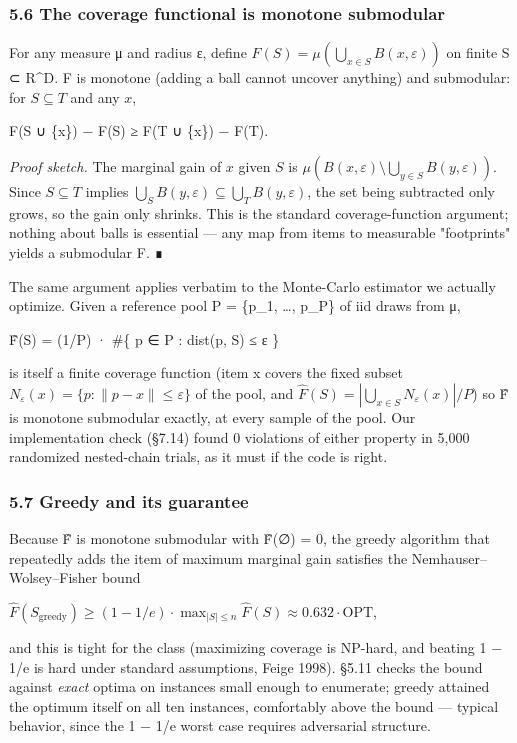 \documentclass[
  10pt,
]{article}
\theoremstyle{plain}
\theoremstyle{definition}
\begin{document}
\subsubsection{5.6 The coverage functional is monotone
submodular}\label{56-the-coverage-functional-is-monotone-submodular}

For any measure μ and radius ε, define
\(F(S) = \mu(\bigcup_{x \in S} B(x,\varepsilon))\) on finite S ⊂ R\^{}D.
F is monotone (adding a ball cannot uncover anything) and submodular:
for \(S \subseteq T\) and any \(x\),

F(S ∪ \{x\}) − F(S) ≥ F(T ∪ \{x\}) − F(T).

\emph{Proof sketch.} The marginal gain of \(x\) given \(S\) is
\(\mu(B(x,\varepsilon) \setminus \bigcup_{y \in S} B(y,\varepsilon))\).
Since \(S \subseteq T\) implies
\(\bigcup_S B(y,\varepsilon) \subseteq \bigcup_T B(y,\varepsilon)\), the
set being subtracted only grows, so the gain only shrinks. This is the
standard coverage-function argument; nothing about balls is essential
--- any map from items to measurable "footprints" yields a submodular F.
∎

The same argument applies verbatim to the Monte-Carlo estimator we
actually optimize. Given a reference pool P = \{p\_1, \ldots, p\_P\} of
iid draws from μ,

F̂(S) = (1/P) · \#\{ p ∈ P : dist(p, S) ≤ ε \}

is itself a finite coverage function (item x covers the fixed subset
\(N_\varepsilon(x) = \{p : \lVert p - x\rVert \le \varepsilon\}\) of the
pool, and \(\hat F(S) = |\bigcup_{x \in S} N_\varepsilon(x)|/P\)) so F̂
is monotone submodular exactly, at every sample of the pool. Our
implementation check (§7.14) found 0 violations of either property in
5,000 randomized nested-chain trials, as it must if the code is right.

\subsubsection{5.7 Greedy and its
guarantee}\label{57-greedy-and-its-guarantee}

Because F̂ is monotone submodular with F̂(∅) = 0, the greedy algorithm
that repeatedly adds the item of maximum marginal gain satisfies the
Nemhauser--Wolsey--Fisher bound

\(\hat F(S_{\text{greedy}}) \ge (1 - 1/e) \cdot \max_{|S| \le n} \hat F(S) \approx 0.632 \cdot \mathrm{OPT}\),

and this is tight for the class (maximizing coverage is NP-hard, and
beating 1 − 1/e is hard under standard assumptions, Feige 1998). §5.11
checks the bound against \emph{exact} optima on instances small enough
to enumerate; greedy attained the optimum itself on all ten instances,
comfortably above the bound --- typical behavior, since the 1 − 1/e
worst case requires adversarial structure.
\end{document}
